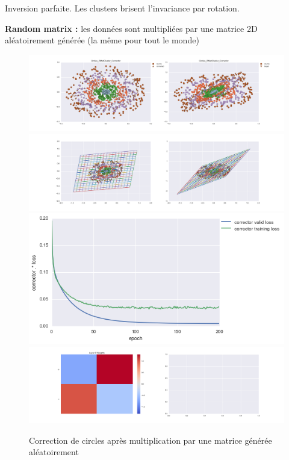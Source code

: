Inversion parfaite. Les clusters brisent l'invariance par rotation.


{\Large \textbf{Random matrix :}} les données sont multipliées par une matrice 2D aléatoirement générée
 (la même pour tout le monde)

\begin{figure}[H] %
\centering
\includegraphics[width=\linewidth]{fig/24-05-2016/circles/Circles_RMatCluster_Corrector-DATA.png}
\includegraphics[width=\linewidth]{fig/24-05-2016/circles/Circles_RMatCluster_Corrector-GridCheck.png}
\includegraphics[width=0.45\linewidth]{fig/24-05-2016/circles/Circles_RMatCluster_Corrector-Learning_curve.png}
\includegraphics[width=\linewidth]{fig/24-05-2016/circles/Circles_RMatCluster_Corrector-W.png}
\caption{Correction de circles après multiplication par une matrice générée aléatoirement}
\label{fig:recap-circles-RMat-cluster}
\end{figure}

